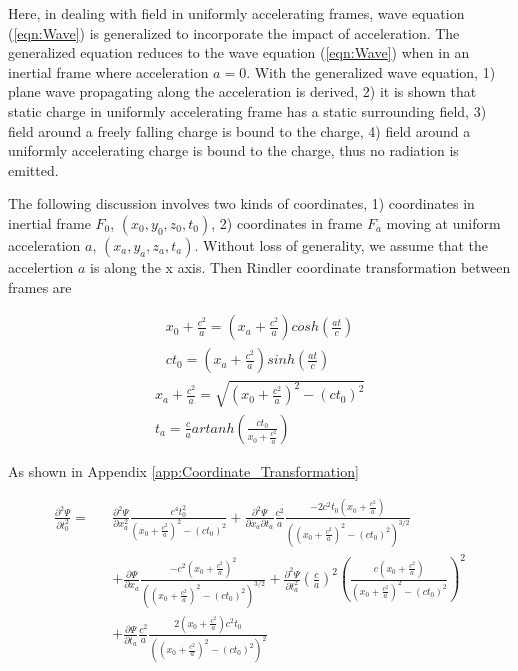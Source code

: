 \documentclass[prd,showpacs,preprint]{revtex4}
\begin{document}
Here, in dealing with field in uniformly accelerating frames, wave equation (\ref{eqn:Wave}) is generalized to incorporate the impact of acceleration. The generalized equation reduces to the wave equation (\ref{eqn:Wave}) when in an inertial frame where acceleration $a=0$. With the generalized wave equation, 1) plane wave propagating along the acceleration is derived, 2) it is shown that static charge in uniformly accelerating frame has a static surrounding field, 3) field around a freely falling charge is bound to the charge, 4) field around a uniformly accelerating charge is bound to the charge, thus no radiation is emitted.

The following discussion involves two kinds of coordinates, 1) coordinates in inertial frame $F_0$,  $(x_0,y_0,z_0,t_0)$, 2) coordinates in frame $F_a$ moving at uniform acceleration $a$, $(x_a,y_a,z_a,t_a)$. Without loss of generality, we assume that the accelertion $a$ is along the x axis. Then Rindler coordinate transformation between frames are

\begin{eqnarray}
x_0+\frac{c^2}{a}=(x_a+\frac{c^2}{a})cosh(\frac{at}{c})\nonumber\\
ct_0=(x_a+\frac{c^2}{a})sinh(\frac{at}{c})
\label{eqn:coordinates0}
\end{eqnarray}
\begin{eqnarray}
x_a+\frac{c^2}{a}=\sqrt{(x_0+\frac{c^2}{a})^2-(ct_0)^2}\nonumber\\
t_a=\frac{c}{a}artanh(\frac{ct_0}{x_0+\frac{c^2}{a}})
\label{eqn:coordinates1}
\end{eqnarray}

As shown in Appendix {\ref{app:Coordinate_Transformation}}

\begin{eqnarray}
\frac{\partial^2 \Psi}{\partial t_0^2}=&&\frac{\partial^2 \Psi}{\partial x_a^2}\frac{c^4t_0^2}{(x_0+\frac{c^2}{a})^2 - (ct_0)^2} + \frac{\partial^2 \Psi}{\partial x_a\partial t_a}\frac{c^2}{a}\frac{-2c^2t_0(x_0+\frac{c^2}{a})}{((x_0+\frac{c^2}{a})^2-(ct_0)^2)^{3/2}}\nonumber\\
&& + \frac{\partial \Psi}{\partial x_a}\frac{-c^2(x_0+\frac{c^2}{a})^2}{((x_0+\frac{c^2}{a})^2-(ct_0)^2)^{3/2}} + \frac{\partial^2 \Psi}{\partial t_a^2}(\frac{c}{a})^2(\frac{c(x_0+\frac{c^2}{a})}{(x_0+\frac{c^2}{a})^2-(ct_0)^2})^2\nonumber\\
&& + \frac{\partial \Psi}{\partial t_a}\frac{c^2}{a}\frac{2(x_0+\frac{c^2}{a})c^2t_0}{((x_0+\frac{c^2}{a})^2-(ct_0)^2)^2}
\label{eqn:Partial2_Psi_Partial_t2}
\end{eqnarray}
\end{document}
